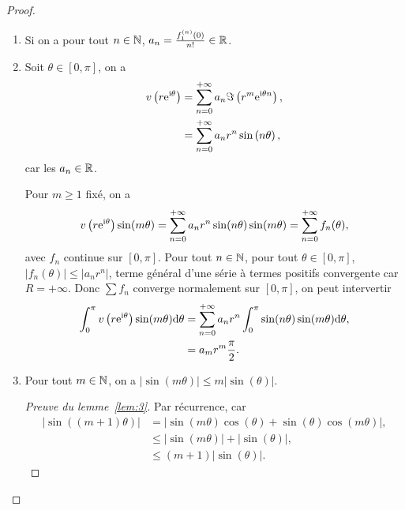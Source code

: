 \documentclass[12pt]{article}
\begin{document}
\begin{proof}
    \phantom{}
    \begin{enumerate}
        \item Si 
        on a pour tout $n\in\mathbb{N}$, $a_n=\frac{f_1^{(n)}(0)}{n!}\in\mathbb{R}$.
        \item Soit $\theta\in[0,\pi]$, on a 
        \begin{align}
            v\left(r\mathrm{e}^{\mathrm{i}\theta}\right)
            &=\sum_{n=0}^{+\infty}a_n\Im\left(r^{m}\mathrm{e}^{\mathrm{i}\theta n}\right),\\
            &=\sum_{n=0}^{+\infty}a_n r^{n}\sin\left(n\theta\right),
        \end{align}
        car les $a_n\in\mathbb{R}$.

        Pour $m\geqslant1$ fixé, on a
        \begin{equation}
            v\left(r\mathrm{e}^{\mathrm{i}\theta}\right)\sin(m\theta)=\sum_{n=0}^{+\infty}a_n r^{n}\sin(n\theta)\sin(m\theta)=\sum_{n=0}^{+\infty}f_n(\theta),
        \end{equation}
        avec $f_n$ continue sur $[0,\pi]$. Pour tout $n\in\mathbb{N}$, pour tout 
        $\theta\in[0,\pi]$, $\left\lvert f_n(\theta)\right\rvert\leqslant\left\lvert a_n r^{n}\right\rvert$, terme général d'une série à termes positifs convergente car $R=+\infty$. Donc $\sum f_n$ converge normalement sur $[0,\pi]$, on peut intervertir
        \begin{align}
            \int_{0}^{\pi}v\left(r\mathrm{e}^{\mathrm{i}\theta}\right)\sin(m\theta)\mathrm{d}\theta
            &=\sum_{n=0}^{+\infty}a_n r^{n}\int_{0}^{\pi}\sin(n\theta)\sin(m\theta)\mathrm{d}\theta,\\
            &=a_m r^{m}\frac{\pi}{2}.
        \end{align}
        
        \item
        \begin{lemma}
            \label{lem:3}
            Pour tout $m\in\mathbb{N}$, on a $\left\lvert\sin(m\theta)\right\rvert\leqslant m\left\lvert\sin(\theta)\right\rvert$.
        \end{lemma}
        \begin{proof}[Preuve du lemme~\ref{lem:3}]
            Par récurrence, car 
            \begin{align}
                \left\lvert\sin\left((m+1)\theta\right)\right\rvert
                &=\left\lvert\sin(m\theta)\cos(\theta)+\sin(\theta)\cos(m\theta)\right\rvert,\\
                &\leqslant \left\lvert\sin(m\theta)\right\rvert+\left\lvert\sin(\theta)\right\rvert,\\
                &\leqslant (m+1)\left\lvert\sin(\theta)\right\rvert.
            \end{align}
        \end{proof}


\end{enumerate}
\end{proof}
\end{document}
